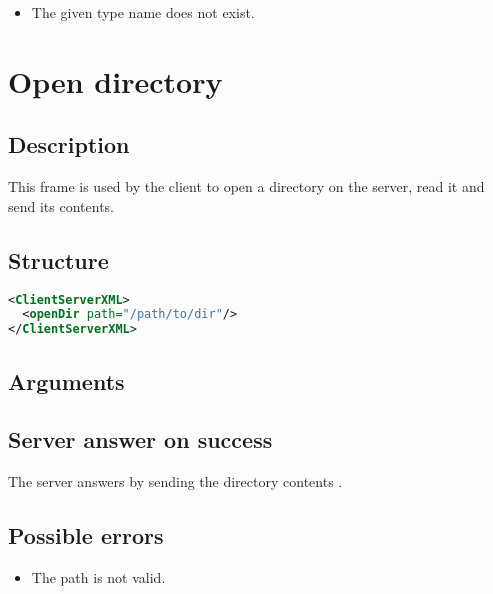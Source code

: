 \begin{itemize}
 \item The given type name does not exist.
\end{itemize}


\section{Open directory}
\label{openDir}

\subsection{Description}

This frame is used by the client to open a directory on the server, read it and
send its contents.

\subsection{Structure}

\begin{lstlisting}[language=XML]
<ClientServerXML>
  <openDir path="/path/to/dir"/>
</ClientServerXML>
\end{lstlisting}

\subsection{Arguments}

\subsection{Server answer on success}

The server answers by sending the directory contents
.

\subsection{Possible errors}

\begin{itemize}
 \item The path is not valid.
\end{itemize}

